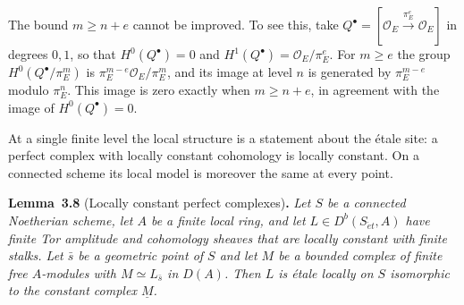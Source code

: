 \documentclass[11pt]{article}
\newenvironment{bpstatement}[2]{\par\addvspace{0.6\baselineskip}\noindent\textbf{#1}#2\textbf{.}\enspace\ignorespaces}
  {\par\addvspace{0.4\baselineskip}}
\newenvironment{bpstatementit}[2]{\begin{bpstatement}{#1}{#2}\itshape\ignorespaces}{\end{bpstatement}}
\begin{document}
\label{bp217}%
The bound \(m\geq n+e\) cannot be improved. To see this, take \(Q^\bullet=[\mathcal O_E\xrightarrow{\pi_E^e}\mathcal O_E]\) in degrees \(0,1\), so that \(H^0(Q^\bullet)=0\) and \(H^1(Q^\bullet)=\mathcal O_E/\pi_E^e\). For \(m\geq e\) the group \(H^0(Q^\bullet/\pi_E^m)\) is \(\pi_E^{m-e}\mathcal O_E/\pi_E^m\), and its image at level \(n\) is generated by \(\pi_E^{m-e}\) modulo \(\pi_E^n\). This image is zero exactly when \(m\geq n+e\), in agreement with the image of \(H^0(Q^\bullet)=0\).

At a single finite level the local structure is a statement about the étale site: a perfect complex with locally constant cohomology is locally constant. On a connected scheme its local model is moreover the same at every point.

\label{bp218}%
\begin{bpstatementit}{Lemma~3.8}{ (Locally constant perfect complexes)}
Let \(S\) be a connected Noetherian scheme, let \(A\) be a finite local ring, and let \(L\in D^b(S_{\acute{e}t},A)\) have finite Tor amplitude and cohomology sheaves that are locally constant with finite stalks. Let \(\bar s\) be a geometric point of \(S\) and let \(M\) be a bounded complex of finite free \(A\)-modules with \(M\simeq L_{\bar s}\) in \(D(A)\). Then \(L\) is étale locally on \(S\) isomorphic to the constant complex \(\underline M\).
\end{bpstatementit}
\end{document}
